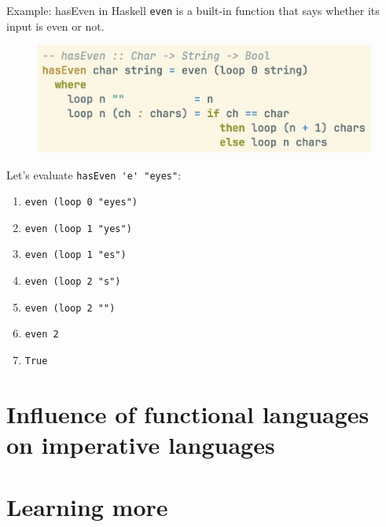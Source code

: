 \documentclass[pdf]{beamer}
\begin{document}
\begin{frame}[fragile]{Example: hasEven in Haskell}
  \verb|even| is a built-in function that says whether its input is even or not.

    \begin{figure}[H]
    \centering
    \includegraphics[width=\linewidth]{hasEven-hs}
  \end{figure}

  \pause
  Let's evaluate \verb|hasEven 'e' "eyes"|:

  \begin{enumerate}
    \item<1-> \verb|even (loop 0 "eyes")|
    \item<2-> \verb|even (loop 1 "yes")|
    \item<3-> \verb|even (loop 1 "es")|
    \item<4-> \verb|even (loop 2 "s")|
    \item<5-> \verb|even (loop 2 "")|
    \item<6-> \verb|even 2|
    \item<7-> \verb|True|
  \end{enumerate}

\end{frame}

\section{Influence of functional languages on imperative languages}
\label{sec:influence}

\section{Learning more}
\label{sec:learning-more}
\end{document}
